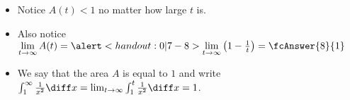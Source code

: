 \begin{frame}
\begin{columns}[c]
\end{columns}
\begin{itemize}
\item<5->  Notice $A(t) < 1$ no matter how large $t$ is.
\item<6->  Also notice $\lim\limits_{t\rightarrow \infty}A(t) = \alert<handout:0| 7-8>{\lim\limits_{t\rightarrow \infty}\left( 1 - \frac{1}{t}\right) = \fcAnswer{8}{1}}$
\item<14->  We say that the area $A$ is equal to $1$ and write $\int_1^\infty \frac{1}{x^2}\diff x = \lim_{t\rightarrow \infty}\int_1^t \frac{1}{x^2}\diff x = 1$.
\end{itemize}
\end{frame}
